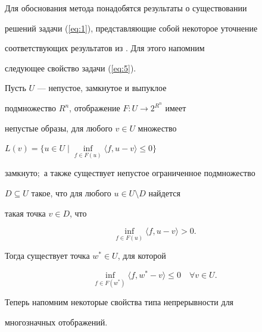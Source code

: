 Для обоснования метода понадобятся результаты о существовании 


решений задачи (\ref{eq:1}), представляющие собой некоторое уточнение 


соответствующих результатов из \cite{PY95}. Для этого напомним 


следующее свойство задачи (\ref{eq:5}).








\begin{prop}


\label{pro:1}


Пусть $U$ --- непустое, замкнутое и выпуклое 


подмножество $R^{n} $, отображение $F: U \rightarrow 2^{R^{n} }$ имеет 


непустые образы, для любого $v \in U$ множество 


$L(v)=\{ u \in U \mid \inf\limits_{f \in F(u)} \langle f,


u-v \rangle \leq 0 \}$


замкнуто$;$ а также существует непустое ограниченное подмножество 


$D \subseteq U$ такое, что для любого $u \in U \setminus D$ найдется


такая точка $v \in D$, что


\begin{equation} \label{eq:6} 


\inf_{f \in F(u)} \langle f, u-v \rangle > 0.


\end{equation}


Тогда существует точка $w^{*} \in U$, для которой


\begin{equation} \label{eq:7} 


\inf_{f \in F(w^{*})} \langle f, w^{*} - v \rangle \leq 0 \quad 


\forall v \in U. 


\end{equation}


\end{prop}





Теперь напомним некоторые свойства типа непрерывности для 


многозначных отображений. 





